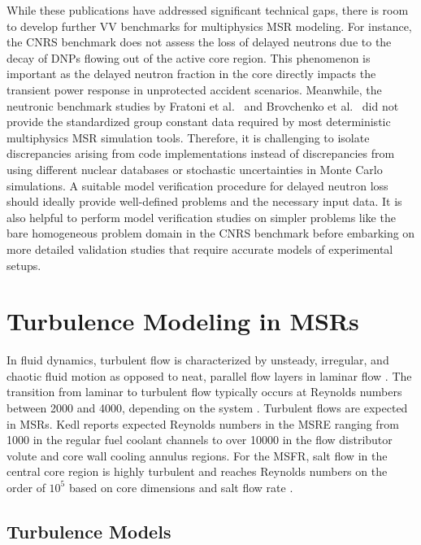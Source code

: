 While these publications have addressed significant technical gaps, there is room to develop
further \gls{VV} benchmarks for multiphysics \gls{MSR} modeling. For instance, the CNRS benchmark
does not assess the loss of delayed neutrons due to the decay of \glspl{DNP} flowing out of the
active core region. This phenomenon is important as the delayed neutron fraction in the core
directly impacts the transient power response in unprotected accident scenarios. Meanwhile, the
neutronic benchmark studies by Fratoni et al.\ \cite{fratoni_molten_2020} and Brovchenko et al.\
\cite{brovchenko_neutronic_2019} did not provide the standardized group constant data required by
most deterministic multiphysics \gls{MSR} simulation tools. Therefore, it is challenging to isolate
discrepancies arising from code implementations instead of discrepancies from using different
nuclear databases or stochastic uncertainties in Monte Carlo simulations. A suitable model
verification procedure for delayed neutron loss should ideally provide well-defined problems and
the necessary input data. It is also helpful to perform model verification studies on simpler
problems like the bare homogeneous problem domain in the CNRS benchmark before embarking on more
detailed validation studies that require accurate models of experimental setups.

\section{Turbulence Modeling in MSRs} \label{sec:lit-turb}

In fluid dynamics, turbulent flow is characterized by unsteady, irregular, and
chaotic fluid motion as opposed to neat, parallel flow layers in laminar flow
\cite{pope_turbulent_2000}. The transition from laminar to turbulent flow
typically occurs at Reynolds numbers between 2000 and 4000, depending on the
system \cite{pope_turbulent_2000}. Turbulent flows are expected in \glspl{MSR}.
Kedl \cite{kedl_fluid_1970} reports expected Reynolds numbers in the \gls{MSRE}
ranging from 1000 in the regular fuel coolant channels to over 10000 in the
flow distributor volute and core wall cooling annulus regions. For the
\gls{MSFR}, salt flow in the central core region is highly turbulent and
reaches Reynolds numbers on the order of $10^5$ based on core dimensions and salt flow rate
\cite{rouch_preliminary_2014}.

\subsection{Turbulence Models}

